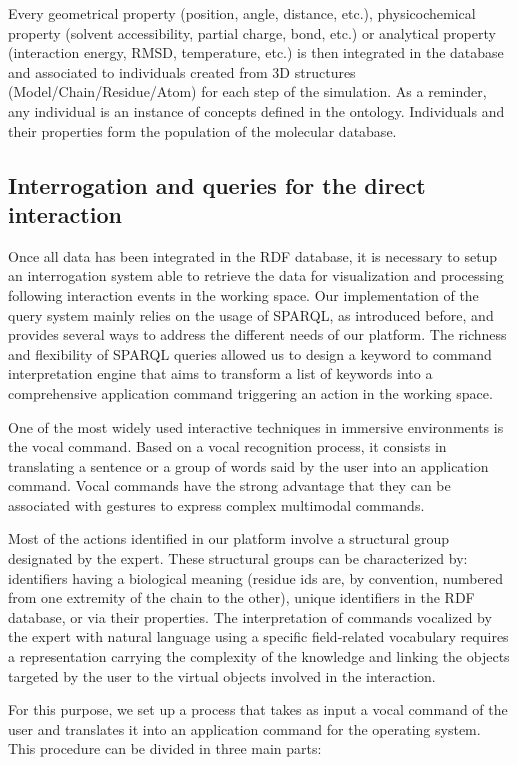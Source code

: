 \documentclass{vgtc}                          %
\begin{document}
Every geometrical property (position, angle, distance, etc.), physicochemical property (solvent accessibility, partial charge, bond, etc.) or analytical property (interaction energy, RMSD, temperature, etc.) is then integrated in the database and associated to individuals created from 3D structures (Model/Chain/Residue/Atom) for each step of the simulation. As a reminder, any individual is an instance of concepts defined in the ontology. Individuals and their properties form the population of the molecular database.

\subsection{Interrogation and queries for the direct interaction}

Once all data has been integrated in the RDF database, it is necessary to setup an interrogation system able to retrieve the data for visualization and processing following interaction events in the working space. Our implementation of the query system mainly relies on the usage of SPARQL, as introduced before, and provides several ways to address the different needs of our platform. The richness and flexibility of SPARQL queries  allowed us to design a keyword to command interpretation engine that aims to transform a list of keywords into a comprehensive application command triggering an action in the working space.

One of the most widely used interactive techniques in immersive environments is the vocal command. Based on a vocal recognition process, it consists in translating a sentence or a group of words said by the user into an application command. Vocal commands have the strong advantage that they can be associated with gestures to express complex multimodal commands.

Most of the actions identified in our platform involve a structural group designated by the expert. These structural groups can be characterized by: identifiers having a biological meaning (residue ids are, by convention, numbered from one extremity of the chain to the other), unique identifiers in the RDF database, or via their properties.
The interpretation of commands vocalized by the expert with natural language using a specific field-related vocabulary requires a representation carrying the complexity of the knowledge and linking the objects targeted by the user to the virtual objects involved in the interaction.

For this purpose, we set up a process that takes as input a vocal command of the user and translates it into an application command for the operating system. This procedure can be divided in three main parts:
\end{document}
